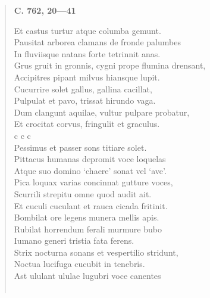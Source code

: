 \documentclass[11pt, a4paper]{report}
\begin{document}
\begin{verse}
    \begin{center} \textbf{C. 762, 20—41} \end{center} \marginpar{[248]} Et castus turtur atque columba gemunt. \\ Pausitat arborea clamans de fronde palumbes \\ In fluviisque natans forte tetrinnit anas. \\ Grus gruit in gronnis, cygni prope flumina drensant, \\ Accipitres pipant milvus hiansque lupit. \\ Cucurrire solet gallus, gallina cacillat, \\ Pulpulat et pavo, trissat hirundo vaga. \\ Dum clangunt aquilae, vultur pulpare probatur, \\ Et crocitat corvus, fringulit et graculus. \\ c c c \\ Pessimus et passer sons titiare solet. \\ Pittacus humanas depromit voce loquelas \\ Atque suo domino ‘chaere’ sonat vel ‘ave’. \\ Pica loquax varias concinnat gutture voces, \\ Scurrili strepitu omne quod audit ait. \\ Et cuculi cuculant et rauca cicada fritinit. \\ Bombilat ore legens munera mellis apis. \\ Rubilat horrendum ferali murmure bubo \\ Iumano generi tristia fata ferens. \\ Strix nocturna sonans et vespertilio stridunt, \\ Noctua lucifuga cucubit in tenebris. \\ Ast ululant ululae lugubri voce canentes \\ 
        ﻿\pagebreak 

\end{verse}
\end{document}
